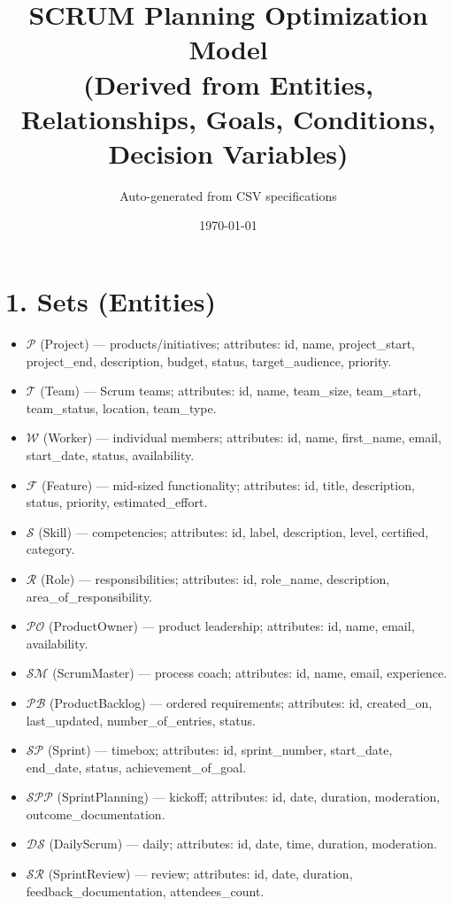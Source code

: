 \documentclass[a4paper,11pt]{article}
\title{SCRUM Planning Optimization Model\\(Derived from Entities, Relationships, Goals, Conditions, Decision Variables)}
\author{Auto-generated from CSV specifications}
\date{\today}
\begin{document}
\maketitle
\tableofcontents
\newpage

\section{1. Sets (Entities)}
\begin{itemize}[leftmargin=2.2em]
  \item $\mathcal{P}$ (Project) — products/initiatives; attributes: id, name, project\_start, project\_end, description, budget, status, target\_audience, priority.
  \item $\mathcal{T}$ (Team) — Scrum teams; attributes: id, name, team\_size, team\_start, team\_status, location, team\_type.
  \item $\mathcal{W}$ (Worker) — individual members; attributes: id, name, first\_name, email, start\_date, status, availability.
  \item $\mathcal{F}$ (Feature) — mid-sized functionality; attributes: id, title, description, status, priority, estimated\_effort.
  \item $\mathcal{S}$ (Skill) — competencies; attributes: id, label, description, level, certified, category.
  \item $\mathcal{R}$ (Role) — responsibilities; attributes: id, role\_name, description, area\_of\_responsibility.
  \item $\mathcal{PO}$ (ProductOwner) — product leadership; attributes: id, name, email, availability.
  \item $\mathcal{SM}$ (ScrumMaster) — process coach; attributes: id, name, email, experience.
  \item $\mathcal{PB}$ (ProductBacklog) — ordered requirements; attributes: id, created\_on, last\_updated, number\_of\_entries, status.
  \item $\mathcal{SP}$ (Sprint) — timebox; attributes: id, sprint\_number, start\_date, end\_date, status, achievement\_of\_goal.
  \item $\mathcal{SPP}$ (SprintPlanning) — kickoff; attributes: id, date, duration, moderation, outcome\_documentation.
  \item $\mathcal{DS}$ (DailyScrum) — daily; attributes: id, date, time, duration, moderation.
  \item $\mathcal{SR}$ (SprintReview) — review; attributes: id, date, duration, feedback\_documentation, attendees\_count.

\end{itemize}
\end{document}
